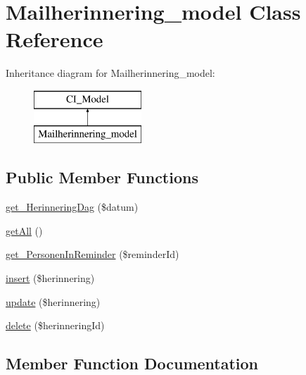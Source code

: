 \hypertarget{class_mailherinnering__model}{}\section{Mailherinnering\+\_\+model Class Reference}
\label{class_mailherinnering__model}
Inheritance diagram for Mailherinnering\+\_\+model\+:\begin{figure}[H]
\begin{center}
\leavevmode
\includegraphics[height=2.000000cm]{class_mailherinnering__model}
\end{center}
\end{figure}
\subsection*{Public Member Functions}
\begin{DoxyCompactItemize}
\item 
\mbox{\hyperlink{class_mailherinnering__model_a29819479620b67d93965786bce00b695}{get\+\_\+\+Herinnering\+Dag}} (\$datum)
\item 
\mbox{\hyperlink{class_mailherinnering__model_aba0d5b303383fb5b1fabb5fd01cd3800}{get\+All}} ()
\item 
\mbox{\hyperlink{class_mailherinnering__model_a4c031458f8607c8960792706ce49f3ab}{get\+\_\+\+Personen\+In\+Reminder}} (\$reminder\+Id)
\item 
\mbox{\hyperlink{class_mailherinnering__model_a1ffebfb064147228f479c1d0b83ac50d}{insert}} (\$herinnering)
\item 
\mbox{\hyperlink{class_mailherinnering__model_a33e5747900292af47d92a2fd6ba4d484}{update}} (\$herinnering)
\item 
\mbox{\hyperlink{class_mailherinnering__model_aa4b59888d725b40a291f7e241fe60203}{delete}} (\$herinnering\+Id)
\end{DoxyCompactItemize}


\subsection{Member Function Documentation}
\mbox{\label{class_mailherinnering__model_aa4b59888d725b40a291f7e241fe60203}} 
